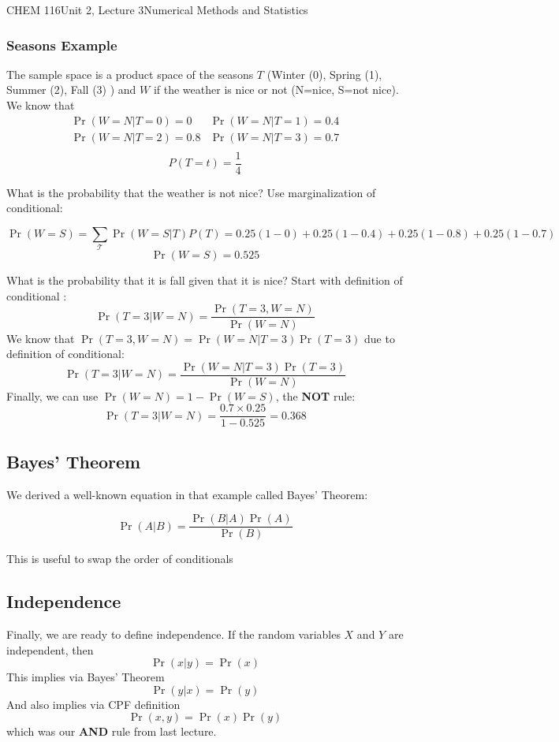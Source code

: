 \documentclass{article}
\begin{document}
\begin{tdoc}{CHEM 116}{Unit 2, Lecture 3}{Numerical Methods and Statistics}
\subsubsection{Seasons Example}

The sample space is a product space of the seasons $T$ (Winter (0), Spring
(1), Summer (2), Fall (3) ) and $W$ if the weather is nice or not (N=nice,
S=not nice). We know that
\[
\begin{array}{lr}
\Pr(W=N|T=0) = 0 & \Pr(W=N|T=1) = 0.4\\
\Pr(W=N|T=2) = 0.8 & \Pr(W=N|T=3) = 0.7\\
\end{array}
\]
\[
P(T=t) = \frac{1}{4}
\]

What is the probability that the weather is not nice? Use
marginalization of conditional:

\[
\Pr(W=S) = \sum_\mathcal{T} \Pr(W=S | T) P(T) = 0.25(1 - 0) + 0.25(1 - 0.4) + 0.25(1 - 0.8) + 0.25(1 - 0.7)
\]
\[
\Pr(W=S) = 0.525
\]

What is the probability that it is fall given that it is nice? Start with definition of conditional :
\[
\Pr(T=3|W=N) = \frac{\Pr(T=3, W=N)}{\Pr(W=N)}
\]
We know that $\Pr(T=3, W=N) = \Pr(W=N|T=3)\Pr(T=3)$ due to definition of conditional:
\[
\Pr(T=3|W=N) = \frac{\Pr(W=N|T=3)\Pr(T=3)}{\Pr(W=N)}
\]
Finally, we can use $\Pr(W=N) = 1 - \Pr(W=S)$, the {\bf NOT} rule:
\[
\Pr(T=3|W=N) = \frac{0.7\times 0.25}{1 - 0.525} = 0.368
\]

\subsection{Bayes' Theorem}

We derived a well-known equation in that example called Bayes' Theorem:

\begin{equation}
\Pr(A|B) = \frac{\Pr(B|A)\Pr(A)}{\Pr(B)}
\end{equation}

This is useful to swap the order of conditionals

\subsection{Independence}
Finally, we are ready to define independence. If the random variables
$X$ and $Y$ are independent, then
\begin{equation}
\Pr(x|y) = \Pr(x)
\end{equation}
This implies via Bayes' Theorem
\begin{equation}
\Pr(y|x) = \Pr(y)
\end{equation}
And also implies via CPF definition
\begin{equation}
\Pr(x,y) = \Pr(x)\Pr(y)
\end{equation}
which was our {\bf AND} rule from last lecture.


\end{tdoc}
\end{document}
